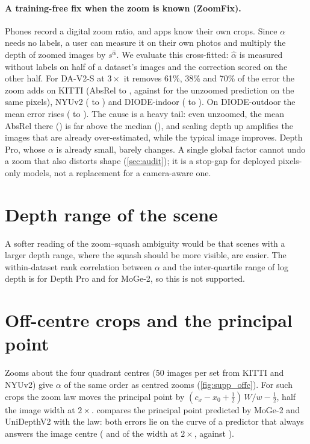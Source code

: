 \documentclass[10pt,twocolumn,letterpaper]{article}
\begin{document}
\paragraph{A training-free fix when the zoom is known (ZoomFix).}
Phones record a digital zoom ratio, and apps know their own crops. Since $\alpha$ needs no labels, a
user can measure it on their own photos and multiply the depth of zoomed images by $s^{\hat\alpha}$.
We evaluate this cross-fitted: $\hat\alpha$ is measured without labels on half of a dataset's images and
the correction scored on the other half. For DA-V2-S at $3\times$ it removes 61\%, 38\% and 70\% of the error
the zoom adds on KITTI (AbsRel \DavTwoSFixKittiZoomed{} to \DavTwoSFixKittiAbsrel, against
\DavTwoSFixKittiTarget{} for the unzoomed prediction on the same pixels), NYUv2 (\DavTwoSFixNyuZoomed{} to
\DavTwoSFixNyuAbsrel) and DIODE-indoor (\DavTwoSFixDiodeInZoomed{} to \DavTwoSFixDiodeInAbsrel). On
DIODE-outdoor the mean error rises (\DavTwoSFixDiodeOutZoomed{} to \DavTwoSFixDiodeOutAbsrel). The cause is
a heavy tail: even unzoomed, the mean AbsRel there (\DavTwoSFixDiodeOutTarget) is far above the median
(\DavTwoSFixDiodeOutTargetMedian), and scaling depth up amplifies the images that are already
over-estimated, while the typical image improves. Depth Pro, whose $\alpha$ is already small, barely changes. A single global factor cannot undo a zoom that also distorts shape (\cref{sec:audit});
it is a stop-gap for deployed pixels-only models, not a replacement for a camera-aware one.

\section{Depth range of the scene}

A softer reading of the zoom--squash ambiguity would be that scenes with a larger depth range, where the squash
should be more visible, are easier. The within-dataset rank correlation between $\alpha$ and the
inter-quartile range of log depth is \DepthproSpreadRho{} for Depth Pro and \MogeTwoSSpreadRho{} for MoGe-2, so
this is not supported.

\section{Off-centre crops and the principal point}

Zooms about the four quadrant centres (50 images per set from KITTI and NYUv2) give $\alpha$ of the same
order as centred zooms (\cref{fig:supp_offc}). For such crops the zoom law moves the principal point
by $(c_x-x_0+\tfrac12)\,W/w-\tfrac12$, half the image width at $2\times$.  compares the
principal point predicted by MoGe-2 and UniDepthV2 with the law: both errors lie on the curve of a
predictor that always answers the image centre (\MogeTwoSPpQuadTwo{} and \UnidepthTwoSPpQuadTwo{} of
the width at $2\times$, against \MogeTwoSPpGuessTwo).
\end{document}
